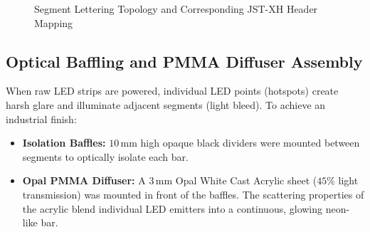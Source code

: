 \documentclass[12pt,a4paper,oneside]{report}
\begin{document}
\begin{figure}[H]
\centering
{}
\caption{Segment Lettering Topology and Corresponding JST-XH Header Mapping}
\label{fig:segment_wiring}
\end{figure}

\subsection{Optical Baffling and PMMA Diffuser Assembly}
When raw LED strips are powered, individual LED points (hotspots) create harsh glare and illuminate adjacent segments (light bleed). To achieve an industrial finish:
\begin{itemize}
    \item \textbf{Isolation Baffles:} $10\,\text{mm}$ high opaque black dividers were mounted between segments to optically isolate each bar.
    \item \textbf{Opal PMMA Diffuser:} A $3\,\text{mm}$ Opal White Cast Acrylic sheet ($45\%$ light transmission) was mounted in front of the baffles. The scattering properties of the acrylic blend individual LED emitters into a continuous, glowing neon-like bar.
\end{itemize}
\end{document}
